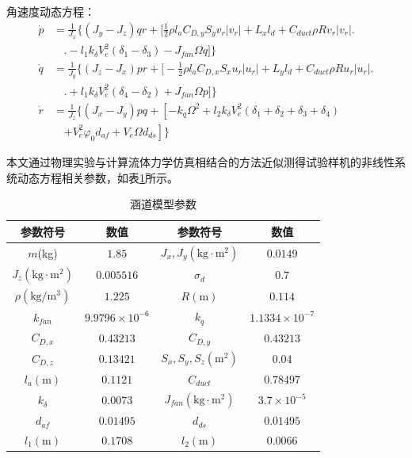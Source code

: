 角速度动态方程：
\begin{equation}
    \begin{aligned}
        \dot{p}  &=\frac{1}{J_x}\Bigg\{ (J_y-J_z)qr+
        \bigg[\frac{1}{2}\rho{l_a} C_{D,y}S_yv_r|v_r|+L_xl_d+C_{duct}\rho{R}
        v_r|v_r| \bigg.\\
        & \quad\bigg.- l_1k_\delta V_e^2(\delta_1 - \delta_3)-J_{fan}\Omega{q}\bigg]\Bigg\} \\
        \dot{q}  &=\frac{1}{J_y}\Bigg\{ (J_z-J_x)pr+
        \bigg[-\frac{1}{2}\rho{l_a} C_{D,x}S_xu_r|u_r|+L_yl_d+C_{duct}\rho{R}
        u_r|u_r| \bigg.\\
        & \quad\bigg.+ l_1k_\delta V_e^2(\delta_4 - \delta_2)+J_{fan}\Omega{p}\bigg]\Bigg\} \\
        \dot{r}  &=\frac{1}{J_z}\Bigg\{ (J_x-J_y)pq+
        \left[-k_q\Omega^2 +l_2k_\delta V_e^2(\delta_1 + \delta_2 + \delta_3 + \delta_4)\right.\\
        & \quad\left.+V_e^2\varphi_0d_{af}+V_e\Omega{d_{ds}}\right]
        \Bigg\}
    \end{aligned}
    \label{eq_43}
\end{equation}

本文通过物理实验与计算流体力学仿真相结合的方法近似测得试验样机的非线性系统动态方程相关参数，如表\ref{DFUAV_parameters}所示。

\begin{table}
	\caption{\label{DFUAV_parameters}涵道模型参数}
	\centering
	\small 
	\begin{tabular}{cccc}
		\hline 
		参数符号 & 数值                & 参数符号 & 数值                 \tabularnewline
		\hline 
		$m$(kg)   & $1.85$ 		     & $J_x,J_y(\text{kg}\cdot{\text{m}}^2)$   & $0.0149         $ \tabularnewline
		$J_z(\text{kg}\cdot{\text{m}}^2)$   & $0.005516$ & $\sigma_d$   & $0.7$ \tabularnewline
        $\rho(\text{kg}/\text{m}^3)$   & $1.225$ & $R(\text{m})$   & $0.114$ \tabularnewline
        $k_{fan}$   & $9.9796\times10^{-6}$ & $k_q$   & $1.1334\times10^{-7}$ \tabularnewline
        $C_{D,x}$   & $0.43213$ & $C_{D,y}$   & $0.43213$ \tabularnewline
        $C_{D,z}$   & $0.13421$ & $S_x,S_y,S_z(\text{m}^2)$   & $0.04$ \tabularnewline
        $l_a(\text{m})$   & $0.1121$ & $C_{duct}$   & $0.78497$ \tabularnewline
        $k_{\delta}$   & $0.0073$ & $J_{fan}(\text{kg}\cdot{\text{m}}^2)$   & $3.7\times10^{-5}$ \tabularnewline
        $d_{af}$   & $0.01495$ & $d_{ds}$   & $0.01495$ \tabularnewline
        $l_1(\text{m})$   & $0.1708$ & $l_2(\text{m})$   & $0.0066$ \tabularnewline
		\hline 
	\end{tabular}
\end{table}

